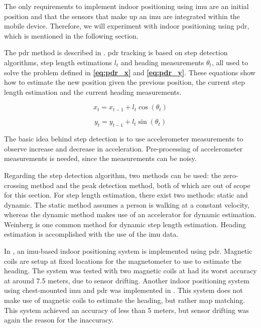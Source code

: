 
The only requirements to implement indoor positioning using \gls{imu} are an initial position and that the sensors that make up an \gls{imu} are integrated within the mobile device. Therefore, we will experiment with indoor positioning using \gls{pdr}, which is mentioned in the following section.

The \gls{pdr} method is described in \cite{HybridPositioningPaper}. \gls{pdr} tracking is based on step detection algorithms, step length estimations $l_t$ and heading measurements $\theta_t$, all used to solve the problem defined in \textbf{\autoref{eq:pdr_x}} and \textbf{\autoref{eq:pdr_y}}. These equations show how to estimate the new position given the previous position, the current step length estimation and the current heading measurements.

\begin{equation} \label{eq:pdr_x}
    x_t = x_{t - 1} + l_t\cos(\theta_t)
\end{equation}

\begin{equation} \label{eq:pdr_y}
    y_t = y_{t - 1} + l_t\sin(\theta_t)
\end{equation}

The basic idea behind step detection is to use accelerometer measurements to observe increase and decrease in acceleration.
Pre-processing of accelerometer measurements is needed, since the measurements can be noisy.

Regarding the step detection algorithm, two methods can be used: the zero-crossing method and the peak detection method, both of which are out of scope for this section.
For step length estimation, there exist two methods: static and dynamic. The static method assumes a person is walking at a constant velocity, whereas the dynamic method makes use of an accelerator for dynamic estimation. Weinberg is one common method for dynamic step length estimation. Heading estimation is accomplished with the use of the \gls{imu} data.

In \cite{IMUPaper}, an \gls{imu}-based indoor positioning system is implemented using \gls{pdr}. Magnetic coils are setup at fixed locations for the magnetometer to use to estimate the heading. The system was tested with two magnetic coils at had its worst accuracy at around 7.5 meters, due to sensor drifting.
Another indoor positioning system using chest-mounted \gls{imu} and \gls{pdr} was implemented in \cite{s19020420}. This system does not make use of magnetic coils to estimate the heading, but rather map matching. This system achieved an accuracy of less than 5 meters, but sensor drifting was again the reason for the inaccuracy.
